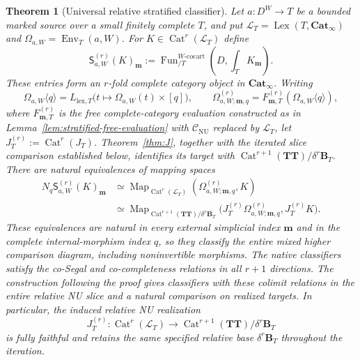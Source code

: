 \documentclass[oneside]{article}
\theoremstyle{plain}
\newtheorem{theorem}{Theorem}[section]
\theoremstyle{definition}
\theoremstyle{remark}
\newcommand{\B}{\mathbf B}
\newcommand{\CNU}{\mathcal C_{\mathrm{NU}}}
\newcommand{\Cat}{\mathbf{Cat}_{\infty}}
\newcommand{\Env}{\operatorname{Env}}
\newcommand{\Fun}{\operatorname{Fun}}
\newcommand{\J}{J}
\newcommand{\Lex}{\operatorname{Lex}}
\newcommand{\Map}{\operatorname{Map}}
\newcommand{\TT}{\mathbf{TT}}
\newcommand{\coc}{\mathrm{cocart}}
\begin{document}
\begin{theorem}[Universal relative stratified classifier]
\label{thm:stratified-relative-classifier}
Let $a:D^W\to T$ be a bounded marked source over a small finitely
complete $T$, and put
$\mathcal L_T=\Lex(T,\Cat)$ and
$\Omega_{a,W}=\Env_T(a,W)$.
For $K\in\operatorname{Cat}^r(\mathcal L_T)$ define
\[
 \mathsf S^{(r)}_{a,W}(K)_{\mathbf m}
 :=\Fun^{W\text{-}\coc}_{/T}
 \left(D,\int_TK_{\mathbf m}\right).
\]
These entries form an $r$-fold complete category object in $\Cat$.
Writing
\[
 \Omega_{a,W}\langle q\rangle
 =L_{\mathrm{lex},T}
 \bigl(t\mapsto\Omega_{a,W}(t)\times[q]\bigr),
 \qquad
 \Omega^{(r)}_{a,W;\mathbf m,q}
 =F^{(r)}_{\mathbf m,T}(\Omega_{a,W}\langle q\rangle),
\]
where $F^{(r)}_{\mathbf m,T}$ is the free complete-category evaluation
constructed as in Lemma~\ref{lem:stratified-free-evaluation} with
$\CNU$ replaced by $\mathcal L_T$, let
$\J_T^{(r)}:=\operatorname{Cat}^r(\J_T)$.
Theorem~\ref{thm:J}, together with the iterated slice
comparison established below, identifies its target with
$\operatorname{Cat}^{r+1}(\TT)/\delta^r\B_T$.
There are natural equivalences of mapping spaces
\begin{equation}\label{eq:stratified-relative-classifier}
\begin{aligned}
 N_q\mathsf S^{(r)}_{a,W}(K)_{\mathbf m}
 &\simeq
 \Map_{\operatorname{Cat}^r(\mathcal L_T)}
 (\Omega^{(r)}_{a,W;\mathbf m,q},K)\\
 &\simeq
 \Map_{\operatorname{Cat}^{r+1}(\TT)/\delta^r\B_T}
 \bigl(\J_T^{(r)}\Omega^{(r)}_{a,W;\mathbf m,q},
       \J_T^{(r)}K\bigr).
\end{aligned}
\end{equation}
These equivalences are natural in every external simplicial index
$\mathbf m$ and in the complete internal-morphism index $q$, so
they classify the entire mixed higher comparison diagram, including
noninvertible morphisms.  The native classifiers satisfy the co-Segal and co-completeness
relations in all $r+1$ directions. The construction following the
proof gives classifiers with these colimit relations in the entire
relative NU slice and a natural comparison on realized targets.  In particular,
the induced relative NU realization
\begin{equation}\label{eq:stratified-relative-NU-embedding}
 \J_T^{(r)}:
 \operatorname{Cat}^r(\mathcal L_T)
 \longrightarrow
 \operatorname{Cat}^{r+1}(\TT)/\delta^r\B_T
\end{equation}
is fully faithful and retains the same specified relative base
$\delta^r\B_T$ throughout the iteration.
\end{theorem}
\end{document}
